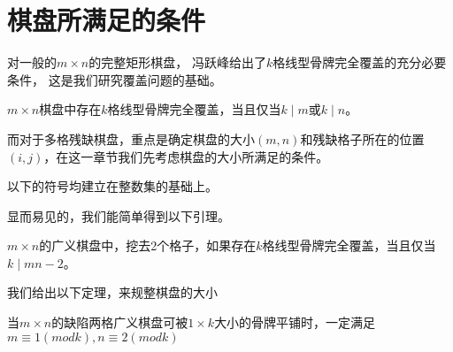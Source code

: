 \chapter{棋盘所满足的条件}
\label{cha:sysu-thesis-contents-format-requirement}
对一般的$m \times n$的完整矩形棋盘， 冯跃峰给出了$k$格线型骨牌完全覆盖的充分必要条件， 这是我们研究覆盖问题的基础。

\begin{lemma}
    \label{basic-lemma-1}
    $m \times n$棋盘中存在$k$格线型骨牌完全覆盖，当且仅当$k \mid m$或$k \mid n$。
\end{lemma}

而对于多格残缺棋盘，重点是确定棋盘的大小$(m, n)$和残缺格子所在的位置$(i, j)$，在这一章节我们先考虑棋盘的大小所满足的条件。

以下的符号均建立在整数集的基础上。

显而易见的，我们能简单得到以下引理。
\begin{lemma}
    \label{basic-lemma-2}
    $m \times n$的广义棋盘中，挖去2个格子，如果存在$k$格线型骨牌完全覆盖，当且仅当$k \mid mn-2$。
\end{lemma}

我们给出以下定理，来规整棋盘的大小
\begin{theorem}
    \label{basic-theorem-1}
    当$m \times n$的缺陷两格广义棋盘可被$1 \times k$大小的骨牌平铺时，一定满足$m \equiv 1 (mod k), n \equiv 2 (mod k)$
\end{theorem}

